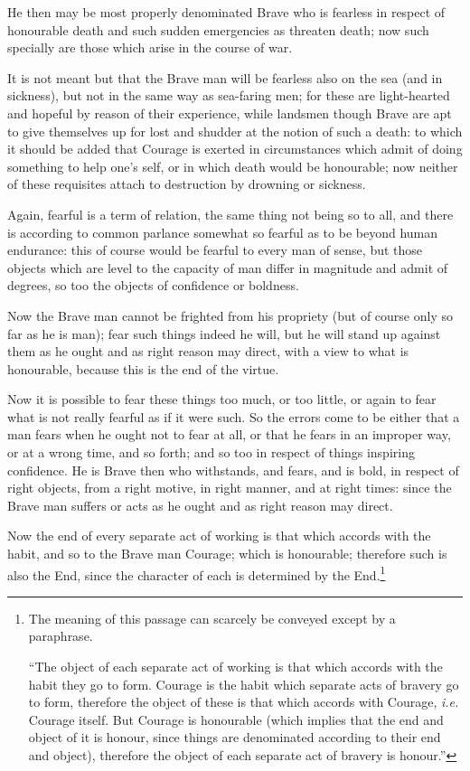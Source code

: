 He then may be most properly denominated Brave who is fearless in respect of
honourable death and such sudden emergencies as threaten death; now such
specially are those which arise in the course of war.

It is not meant but that the Brave man will be fearless also on the sea (and in
sickness), but not in the same way as sea-faring men; for these are
light-hearted and hopeful by reason of their experience, while landsmen though
Brave are apt to give themselves up for lost and shudder at the notion of such
a death: to which it should be added that Courage is exerted in circumstances
which admit of doing something to help one’s self, or in which death
would be honourable; now neither of these requisites attach to destruction by
drowning or sickness.


Again, fearful is a term of relation, the same thing not being so to all, and
there is according to common parlance somewhat so fearful as to be beyond human
endurance: this of course would be fearful to every man of sense, but those
objects which are level to the capacity of man differ in magnitude and admit of
degrees, so too the objects of confidence or boldness.

Now the Brave man cannot be frighted from his propriety (but of course only so
far as he is man); fear such things indeed he will, but he will stand up
against them as he ought and as right reason may direct, with a view to what is
honourable, because this is the end of the virtue.

Now it is possible to fear these things too much, or too little, or again to
fear what is not really fearful as if it were such. So the errors come to be
either that a man fears when he ought not to fear at all, or that he fears in
an improper way, or at a wrong time, and so forth; and so too in respect of
things inspiring confidence. He is Brave then who withstands, and fears, and is
bold, in respect of right objects, from a right motive, in right manner, and at
right times: since the Brave man suffers or acts as he ought and as right
reason may direct.

Now the end of every separate act of working is that which accords with the
habit, and so to the Brave man Courage; which is honourable; therefore such is
also the End, since the character of each is determined by the End.\footnote{The meaning of this passage can scarcely be conveyed except by a
paraphrase.

“The object of each separate act of working is that which accords
with the habit they go to form. Courage is the habit which separate acts of
bravery go to form, therefore the object of these is that which accords with
Courage, \emph{i.e.} Courage itself. But Courage is honourable (which implies
that the end and object of it is honour, since things are denominated according
to their end and object), therefore the object of each separate act of bravery
is honour.”}

